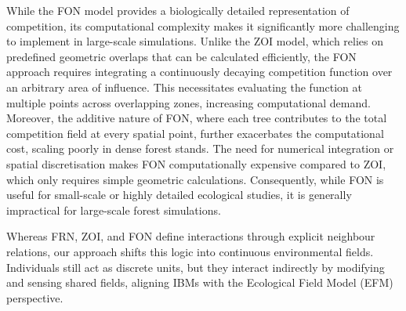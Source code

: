 While the FON model provides a biologically detailed representation of competition, its computational complexity makes it significantly more challenging to implement in large-scale simulations. Unlike the ZOI model, which relies on predefined geometric overlaps that can be calculated efficiently, the FON approach requires integrating a continuously decaying competition function over an arbitrary area of influence. This necessitates evaluating the function at multiple points across overlapping zones, increasing computational demand. Moreover, the additive nature of FON, where each tree contributes to the total competition field at every spatial point, further exacerbates the computational cost, scaling poorly in dense forest stands. The need for numerical integration or spatial discretisation makes FON computationally expensive compared to ZOI, which only requires simple geometric calculations. Consequently, while FON is useful for small-scale or highly detailed ecological studies, it is generally impractical for large-scale forest simulations.

\midConclusion 

Whereas FRN, ZOI, and FON define interactions through explicit neighbour relations, our approach shifts this logic into continuous environmental fields. Individuals still act as discrete units, but they interact indirectly by modifying and sensing shared fields, aligning IBMs with the Ecological Field Model (EFM) perspective.

